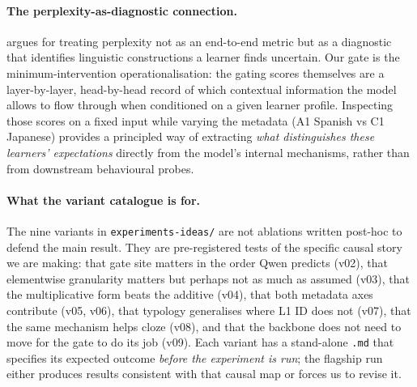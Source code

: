 \paragraph{The perplexity-as-diagnostic connection.}
\citet{stearns2025nwpaleval} argues for treating perplexity not as an
end-to-end metric but as a diagnostic that identifies linguistic
constructions a learner finds uncertain. Our gate is the
minimum-intervention operationalisation: the gating scores themselves
are a layer-by-layer, head-by-head record of which contextual
information the model allows to flow through when conditioned on a
given learner profile. Inspecting those scores on a fixed input while
varying the metadata (A1 Spanish vs C1 Japanese) provides a principled
way of extracting \emph{what distinguishes these learners' expectations}
directly from the model's internal mechanisms, rather than from
downstream behavioural probes.

\paragraph{What the variant catalogue is for.}
The nine variants in \texttt{experiments-ideas/} are not ablations
written post-hoc to defend the main result. They are pre-registered
tests of the specific causal story we are making: that gate site
matters in the order Qwen predicts (v02), that elementwise granularity
matters but perhaps not as much as assumed (v03), that the
multiplicative form beats the additive (v04), that both metadata axes
contribute (v05, v06), that typology generalises where L1 ID does not
(v07), that the same mechanism helps cloze (v08), and that the
backbone does not need to move for the gate to do its job (v09). Each
variant has a stand-alone \texttt{.md} that specifies its expected
outcome \emph{before the experiment is run}; the flagship run either
produces results consistent with that causal map or forces us to
revise it.
